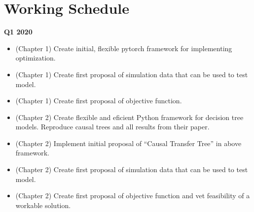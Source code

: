 \documentclass[a4paper,12pt]{article}
\begin{document}



%
%



\printbibliography

\appendix

\section { Working Schedule }


\textbf{Q1 2020}

\begin{itemize}
\item (Chapter 1) Create initial, flexible pytorch framework for implementing optimization.
\item (Chapter 1) Create first proposal of simulation data that can be used to test model.
\item (Chapter 1) Create first proposal of objective function.
\item (Chapter 2) Create flexible and eficient Python framework for decision tree models. Reproduce causal trees and all results from their paper.
\item (Chapter 2) Implement initial proposal of “Causal Transfer Tree” in above framework.
\item (Chapter 2) Create first proposal of simulation data that can be used to test model.
\item (Chapter 2) Create first proposal of objective function and vet feasibility of a workable solution.
\end{itemize}
\end{document}
